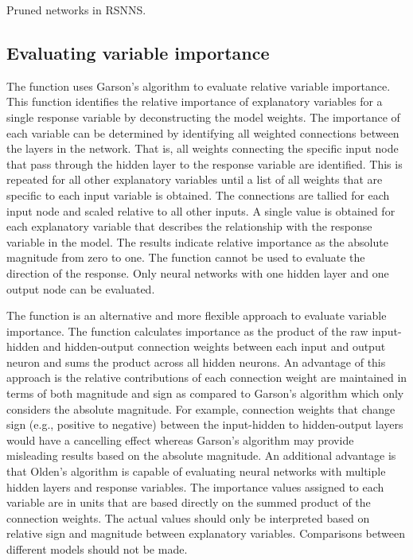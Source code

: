 \documentclass[article]{jss}\usepackage[]{graphicx}\usepackage[]{color}
\begin{document}
Pruned networks in RSNNS.

\subsection{Evaluating variable importance}

The  function uses Garson's algorithm to evaluate relative variable importance. This function identifies the relative importance of explanatory variables for a single response variable by deconstructing the model weights. The importance of each variable can be determined by identifying all weighted connections between the layers in the network. That is, all weights connecting the specific input node that pass through the hidden layer to the response variable are identified. This is repeated for all other explanatory variables until a list of all weights that are specific to each input variable is obtained. The connections are tallied for each input node and scaled relative to all other inputs. A single value is obtained for each explanatory variable that describes the relationship with the response variable in the model. The results indicate relative importance as the absolute magnitude from zero to one. The function cannot be used to evaluate the direction of the response. Only neural networks with one hidden layer and one output node can be evaluated.

The  function is an alternative and more flexible approach to evaluate variable importance. The function calculates importance as the product of the raw input-hidden and hidden-output connection weights between each input and output neuron and sums the product across all hidden neurons. An advantage of this approach is the relative contributions of each connection weight are maintained in terms of both magnitude and sign as compared to Garson's algorithm which only considers the absolute magnitude. For example, connection weights that change sign (e.g., positive to negative) between the input-hidden to hidden-output layers would have a cancelling effect whereas Garson's algorithm may provide misleading results based on the absolute magnitude. An additional advantage is that Olden's algorithm is capable of evaluating neural networks with multiple hidden layers and response variables. The importance values assigned to each variable are in units that are based directly on the summed product of the connection weights. The actual values should only be interpreted based on relative sign and magnitude between explanatory variables. Comparisons between different models should not be made.
\end{document}

